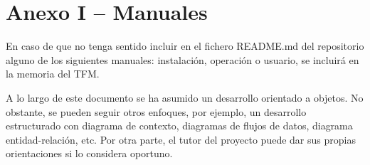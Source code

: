 \vspace*{-2cm}
\section*{Anexo I – Manuales}
\label{anexo:manuales}

En caso de que no tenga sentido incluir en el fichero README.md del repositorio alguno de los siguientes manuales: instalación, operación o usuario, se incluirá en la memoria del TFM.

A lo largo de este documento se ha asumido un desarrollo orientado a objetos. No obstante, se pueden seguir otros enfoques, por ejemplo, un desarrollo estructurado con diagrama de contexto, diagramas de flujos de datos, diagrama entidad-relación, etc.
Por otra parte, el tutor del proyecto puede dar sus propias orientaciones si lo considera oportuno.

